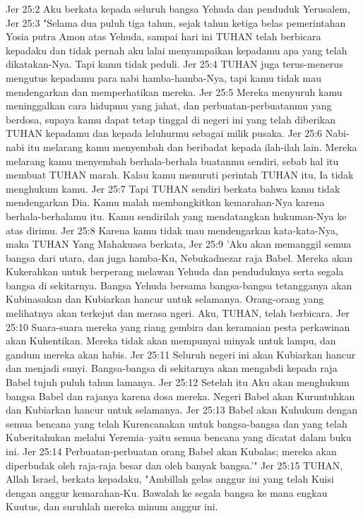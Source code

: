 Jer 25:2  Aku berkata kepada seluruh bangsa Yehuda dan penduduk Yerusalem,
Jer 25:3  "Selama dua puluh tiga tahun, sejak tahun ketiga belas pemerintahan Yosia putra Amon atas Yehuda, sampai hari ini TUHAN telah berbicara kepadaku dan tidak pernah aku lalai menyampaikan kepadamu apa yang telah dikatakan-Nya. Tapi kamu tidak peduli.
Jer 25:4  TUHAN juga terus-menerus mengutus kepadamu para nabi hamba-hamba-Nya, tapi kamu tidak mau mendengarkan dan memperhatikan mereka.
Jer 25:5  Mereka menyuruh kamu meninggalkan cara hidupmu yang jahat, dan perbuatan-perbuatanmu yang berdosa, supaya kamu dapat tetap tinggal di negeri ini yang telah diberikan TUHAN kepadamu dan kepada leluhurmu sebagai milik pusaka.
Jer 25:6  Nabi-nabi itu melarang kamu menyembah dan beribadat kepada ilah-ilah lain. Mereka melarang kamu menyembah berhala-berhala buatanmu sendiri, sebab hal itu membuat TUHAN marah. Kalau kamu menuruti perintah TUHAN itu, Ia tidak menghukum kamu.
Jer 25:7  Tapi TUHAN sendiri berkata bahwa kamu tidak mendengarkan Dia. Kamu malah membangkitkan kemarahan-Nya karena berhala-berhalamu itu. Kamu sendirilah yang mendatangkan hukuman-Nya ke atas dirimu.
Jer 25:8  Karena kamu tidak mau mendengarkan kata-kata-Nya, maka TUHAN Yang Mahakuasa berkata,
Jer 25:9  'Aku akan memanggil semua bangsa dari utara, dan juga hamba-Ku, Nebukadnezar raja Babel. Mereka akan Kukerahkan untuk berperang melawan Yehuda dan penduduknya serta segala bangsa di sekitarnya. Bangsa Yehuda bersama bangsa-bangsa tetangganya akan Kubinasakan dan Kubiarkan hancur untuk selamanya. Orang-orang yang melihatnya akan terkejut dan merasa ngeri. Aku, TUHAN, telah berbicara.
Jer 25:10  Suara-suara mereka yang riang gembira dan keramaian pesta perkawinan akan Kuhentikan. Mereka tidak akan mempunyai minyak untuk lampu, dan gandum mereka akan habis.
Jer 25:11  Seluruh negeri ini akan Kubiarkan hancur dan menjadi sunyi. Bangsa-bangsa di sekitarnya akan mengabdi kepada raja Babel tujuh puluh tahun lamanya.
Jer 25:12  Setelah itu Aku akan menghukum bangsa Babel dan rajanya karena dosa mereka. Negeri Babel akan Kuruntuhkan dan Kubiarkan hancur untuk selamanya.
Jer 25:13  Babel akan Kuhukum dengan semua bencana yang telah Kurencanakan untuk bangsa-bangsa dan yang telah Kuberitahukan melalui Yeremia--yaitu semua bencana yang dicatat dalam buku ini.
Jer 25:14  Perbuatan-perbuatan orang Babel akan Kubalas; mereka akan diperbudak oleh raja-raja besar dan oleh banyak bangsa.'"
Jer 25:15  TUHAN, Allah Israel, berkata kepadaku, "Ambillah gelas anggur ini yang telah Kuisi dengan anggur kemarahan-Ku. Bawalah ke segala bangsa ke mana engkau Kuutus, dan suruhlah mereka minum anggur ini.
